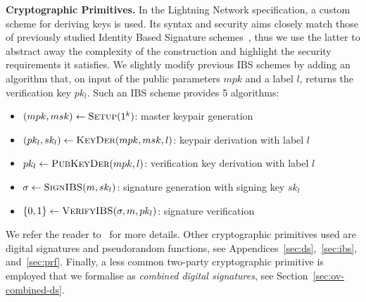   \noindent \textbf{Cryptographic Primitives.}
    In the Lightning Network specification, a custom scheme for deriving keys is
    used. Its syntax and security aims closely match those of previously studied
    Identity Based Signature schemes~\cite{ibsshamir,ibspaterson}, thus we use
    the latter to abstract away the complexity of the construction and highlight
    the security requirements it satisfies. We slightly modify previous IBS
    schemes by adding an algorithm that, on input of the public parameters $mpk$
    and a label $l$, returns the verification key $pk_l$. Such an IBS scheme
    provides 5 algorithms:
    \begin{itemize}
      \item $(mpk, msk) \leftarrow \textsc{Setup}(1^k)$: master keypair
      generation
      \item $(pk_l, sk_l) \leftarrow \textsc{KeyDer}(mpk, msk, l)$: keypair
      derivation with label $l$
      \item $pk_l \leftarrow \textsc{PubKeyDer}(mpk, l)$: verification key
      derivation with label $l$
      \item $\sigma \leftarrow \textsc{SignIBS}(m, sk_l)$: signature generation
      with signing key $sk_l$
      \item $\{0, 1\} \leftarrow \textsc{VerifyIBS}(\sigma, m, pk_l)$: signature
      verification
    \end{itemize}
    We refer the reader to~\cite{ibspaterson} for more details. Other
    cryptographic primitives used are digital signatures and pseudorandom
    functions, see Appendices~\ref{sec:ds},~\ref{sec:ibs},
    and~\ref{sec:prf}. Finally, a less common  two-party cryptographic
    primitive is employed that we formalise as {\em  combined digital
    signatures}, see Section~\ref{sec:ov-combined-ds}.
